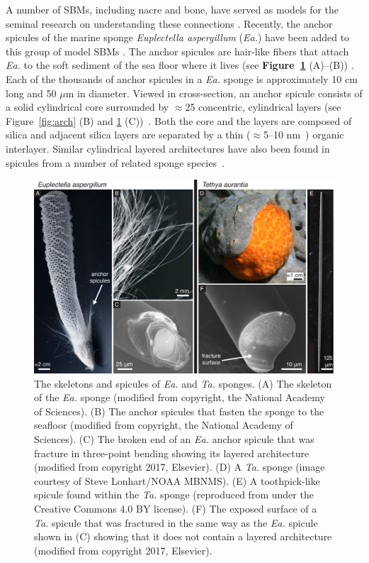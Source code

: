 \documentclass[12pt,onecolumn]{article}
\makeatletter
\newcommand{\TA}{\textit{Ta.\@}\xspace}
\newcommand{\EA}{\textit{Ea.\@}\xspace}
\makeatother
\begin{document}
\begin{bibunit}
A number of SBMs, including nacre and bone, have served as models for the seminal research on understanding these connections \cite{jackson1988,currey1977}. Recently, the anchor spicules of the marine sponge \textit{Euplectella aspergillum} (\EA) have been added to this group of model SBMs \cite{mayer2005rigid,mayer2011new,kolednik2011bioinspired,walter2007mechanisms}. The anchor spicules are hair-like fibers that attach \EA to the soft sediment of the sea floor where it lives (see {\bf Figure~\ref{fig:EATA}} (A)--(B)) \cite{weaver2007hierarchical}. Each of the thousands of anchor spicules in a \EA sponge is approximately 10 cm long and 50 $\mu$m in diameter. Viewed in cross-section, an anchor spicule consists of a solid cylindrical core surrounded by $\approx$25 concentric, cylindrical layers (see Figure~\ref{fig:arch} (B) and \ref{fig:EATA} (C))~\cite{aizenberg2005skeleton,weaver2007hierarchical,monn2015new}. Both the core and the layers are composed of silica and adjacent silica layers are separated by a thin ($\approx$5--10 nm~\cite{weaver2007hierarchical}) organic interlayer.
Similar cylindrical layered architectures have also been found in spicules from a number of related sponge species~\cite{sarikaya2001biomimetic,weaver2010unifying,levi1989remarkably,wang2010silica}.
%
			\begin{figure}[ht!]
			\centering
			\includegraphics[width=\textwidth]{../Figures/FigureEATA/Figure2_V2.pdf}
			\caption{The skeletons and spicules of \EA and \TA sponges. (A) The skeleton of the \EA sponge (modified from \cite{monn2015new} copyright, the National Academy of Sciences). (B) The anchor spicules that fasten the sponge to the seafloor (modified from \cite{monn2015new} copyright, the National Academy of Sciences). (C) The broken end of an \EA anchor spicule that was fracture in three-point bending showing its layered architecture (modified from \cite{monn2017enhanced} copyright 2017, Elsevier). (D) A \TA sponge (image courtesy of Steve Lonhart/NOAA MBNMS). (E) A toothpick-like spicule found within the \TA sponge (reproduced from \cite{monn2017new} under the Creative Commons 4.0 BY license). (F) The exposed surface of a \TA spicule that was fractured in the same way as the \EA spicule shown in (C) showing that it does not contain a layered architecture (modified from \cite{monn2017enhanced} copyright 2017, Elsevier).}
			\label{fig:EATA}
			\end{figure}


\end{bibunit}
\end{document}
